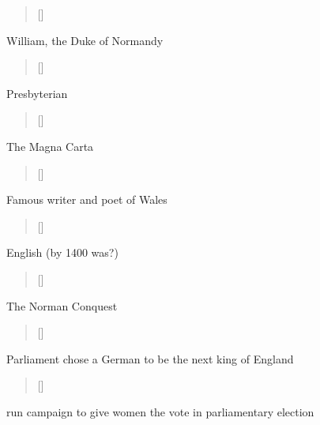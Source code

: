 \documentclass[grid,avery5371]{flashcards}
\begin{document}
\begin{flashcard}[]{%
\begin{verse}[\versewidth]
\end{verse}}
William, the Duke of Normandy
\end{flashcard}

\begin{flashcard}[]{%
\begin{verse}[\versewidth]
\end{verse}}
Presbyterian
\end{flashcard}

\begin{flashcard}[]{%
\begin{verse}[\versewidth]
\end{verse}}
The Magna Carta
\end{flashcard}

\begin{flashcard}[]{%
\begin{verse}[\versewidth]
\end{verse}}
Famous writer and poet of Wales
\end{flashcard}

\begin{flashcard}[]{%
\begin{verse}[\versewidth]
\end{verse}}
English (by 1400 was?)
\end{flashcard}


\begin{flashcard}[]{%
\begin{verse}[\versewidth]
\end{verse}}
The Norman Conquest
\end{flashcard}

\begin{flashcard}[]{%
\begin{verse}[\versewidth]
\end{verse}}
Parliament chose a German to be the next king of England 
\end{flashcard}

\begin{flashcard}[]{%
\begin{verse}[\versewidth]
\end{verse}}

run campaign to give women the vote in parliamentary election

\end{flashcard}
\end{document}
